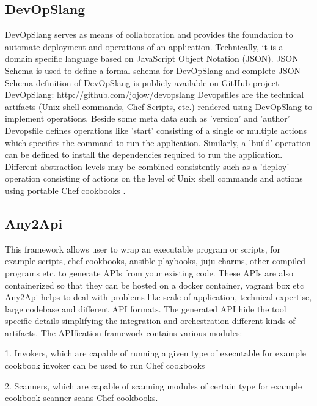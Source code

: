 \subsection{DevOpSlang}
     
     DevOpSlang serves as means of collaboration and provides the
     foundation to automate deployment and operations of an
     application. Technically, it is a domain specific language based
     on JavaScript Object Notation (JSON). JSON Schema is used to
     define a formal schema for DevOpSlang and complete JSON Schema
     definition of DevOpSlang is publicly available on GitHub project
     DevOpSlang: http://github.com/jojow/devopslang Devopsfiles are
     the technical artifacts (Unix shell commands, Chef Scripts, etc.)
     rendered using DevOpSlang to implement operations.  Beside some
     meta data such as ’version’ and ’author’ Devopsfile defines
     operations like ’start’ consisting of a single or multiple
     actions which specifies the command to run the
     application. Similarly, a ’build’ operation can be defined to
     install the dependencies required to run the
     application. Different abstraction levels may be combined
     consistently such as a ’deploy’ operation consisting of actions
     on the level of Unix shell commands and actions using portable
     Chef cookbooks \cite{DevOpSlang}.

\subsection{Any2Api}

     This framework \cite{wettinger-any2api} allows user to wrap an
     executable program or scripts, for example scripts, chef
     cookbooks, ansible playbooks, juju charms, other compiled
     programs etc. to generate APIs from your existing code.  These
     APIs are also containerized so that they can be hosted on a
     docker container, vagrant box etc Any2Api helps to deal with
     problems like scale of application, technical expertise, large
     codebase and different API formats. The generated API hide the
     tool specific details simplifying the integration and
     orchestration different kinds of artifacts. The APIfication
     framework contains various modules:

     1. Invokers, which are capable of running a given type of
        executable for example cookbook invoker can be used to run Chef
        cookbooks

     2. Scanners, which are capable of scanning modules of certain type for
        example cookbook scanner scans Chef cookbooks.

